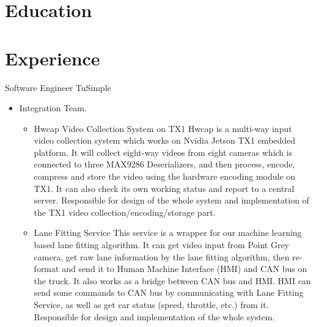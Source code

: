 \documentclass[10pt,a4paper,roman]{moderncv} %
\begin{document}
\makecvtitle

\vspace{-1cm}

\section{Education}

\section{Experience}
        {Software Engineer}
        {}
        {TuSimple}
        {}
        {\begin{itemize}%
         \item Integration Team.
               \begin{itemize}%
               \item Hwcap Video Collection System on TX1\newline{}%
                     Hwcap is a multi-way input video collection system which works on Nvidia Jetson TX1 embedded platform. It will collect eight-way videos from eight cameras which is connected to three MAX9286 Deserializers\footnotemark[1]{}, and then process, encode, compress and store the video using the hardware encoding module on TX1. It can also check its own working status and report to a central server.
                     Responsible for design of the whole system and implementation of the TX1 video collection/encoding/storage part.
               \item Lane Fitting Service\newline{}%
                     This service is a wrapper for our machine learning based lane fitting algorithm. It can get video input from Point Grey camera, get raw lane information by the lane fitting algorithm, then re-format and send it to Human Machine Interface (HMI) and CAN bus on the truck.
                     It also works as a bridge between CAN bus and HMI. HMI can send some commands to CAN bus by communicating with Lane Fitting Service, as well as get car status (speed, throttle, etc.) from it.
                     Responsible for design and implementation of the whole system.
               \end{itemize}
         \end{itemize}}
\end{document}
